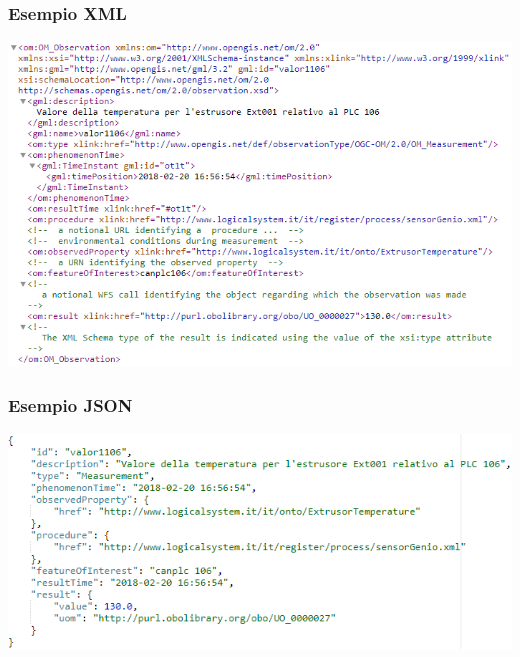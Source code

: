\documentclass{beamer}
\begin{document}
\begin{frame}
\frametitle{Esempio XML}
\includegraphics[width=1\textwidth]{images/TemperatureXML2.png}
\end{frame}

\begin{frame}
\frametitle{Esempio JSON}
\includegraphics[width=1\textwidth]{images/TemperatureJSON.png}
\end{frame}
\end{document}
